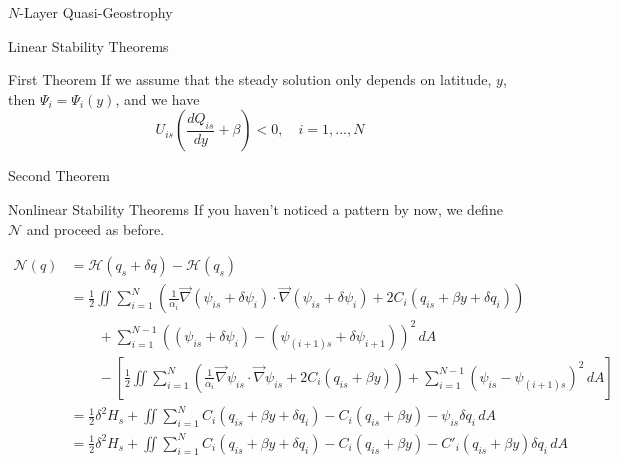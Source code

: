 \documentclass[12pt]{article}
\begin{document}
\begin{section}{$N$-Layer Quasi-Geostrophy}
\begin{subsection}{Linear Stability Theorems}
\begin{subsubsection}{First Theorem}
            If we assume that the steady solution only depends on latitude, $y$, then $\Psi_i = \Psi_i(y)$, and we have
            $$
            U_{is} \left(\frac{d Q_{is}}{dy} + \beta \right) < 0, \quad i=1,...,N
            $$
        \end{subsubsection}
        \begin{subsubsection}{Second Theorem}
        \end{subsubsection}
    \end{subsection}

    \begin{subsection}{Nonlinear Stability Theorems}
        If you haven't noticed a pattern by now, we define $\mathcal{N}$ and proceed as before.

        \begin{align*}
            \mathcal{N}(q)
            & = \mathcal{H}(q_s + \delta q) - \mathcal{H}(q_s) \\
            &= \frac12 \iint \sum_{i=1}^N \left( \frac{1}{\alpha_i}\vec\nabla (\psi_{is} + \delta\psi_i) \cdot \vec\nabla (\psi_{is} + \delta\psi_i) + 2C_i(q_{is} + \beta y + \delta q_i) \right) \\
            &\quad\quad + \sum_{i=1}^{N-1}((\psi_{is} + \delta\psi_i) - (\psi_{(i+1)s} + \delta\psi_{i+1}))^2 \, dA \\
            &\quad\quad - \left[ \frac12 \iint \sum_{i=1}^N \left( \frac{1}{\alpha_i}\vec\nabla \psi_{is} \cdot \vec\nabla \psi_{is} + 2C_i(q_{is} + \beta y) \right) + \sum_{i=1}^{N-1}(\psi_{is} - \psi_{(i+1)s})^2 \, dA \right] \\
            &= \frac12 \delta^2 H_s + \iint \sum_{i=1}^N C_i(q_{is} + \beta y + \delta q_i) - C_i(q_{is} + \beta y) - \psi_{is}\delta q_i \, dA \\
            &= \frac12 \delta^2 H_s + \iint \sum_{i=1}^N C_i(q_{is} + \beta y + \delta q_i) - C_i(q_{is} + \beta y) - C'_i(q_{is} + \beta y)\delta q_i \, dA \\
        \end{align*}
    \end{subsection}
\end{section}
\end{document}
